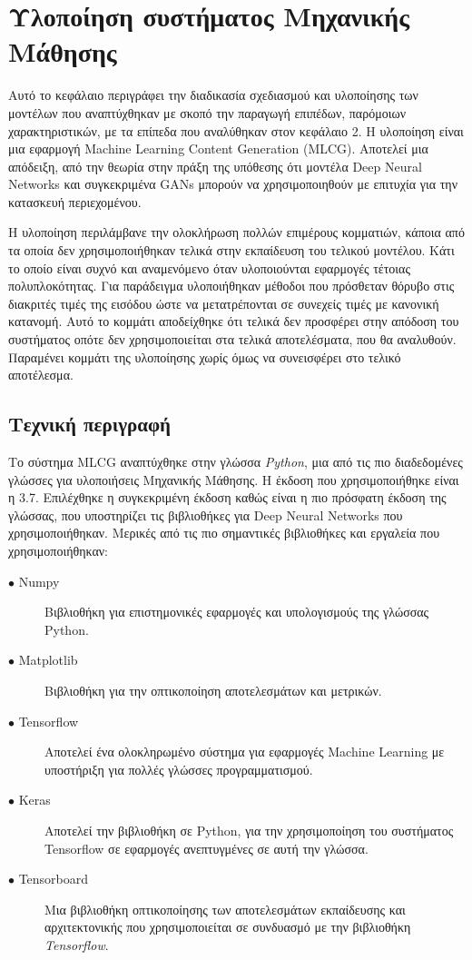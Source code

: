 \chapter{Υλοποίηση συστήματος Μηχανικής Μάθησης}

Αυτό το κεφάλαιο περιγράφει την διαδικασία σχεδιασμού και υλοποίησης των μοντέλων που αναπτύχθηκαν με σκοπό την παραγωγή επιπέδων, παρόμοιων χαρακτηριστικών, με τα επίπεδα που αναλύθηκαν στον κεφάλαιο 2. Η υλοποίηση είναι μια εφαρμογή Machine Learning Content Generation (MLCG). Αποτελεί μια απόδειξη, από την θεωρία στην πράξη της υπόθεσης ότι μοντέλα Deep Neural Networks και συγκεκριμένα GANs \cite{firstgan3} \cite{firstgan} \cite{firstgan2} μπορούν να χρησιμοποιηθούν με επιτυχία για την κατασκευή περιεχομένου.
\par
Η υλοποίηση περιλάμβανε την ολοκλήρωση πολλών επιμέρους κομματιών, κάποια από τα οποία δεν χρησιμοποιήθηκαν τελικά στην εκπαίδευση του τελικού μοντέλου. Κάτι το οποίο είναι συχνό και αναμενόμενο όταν υλοποιούνται εφαρμογές τέτοιας πολυπλοκότητας. Για παράδειγμα υλοποιήθηκαν μέθοδοι που πρόσθεταν θόρυβο στις διακριτές τιμές της εισόδου ώστε να μετατρέπονται σε συνεχείς τιμές με κανονική κατανομή. Αυτό το κομμάτι αποδείχθηκε ότι τελικά δεν προσφέρει στην απόδοση του συστήματος οπότε δεν χρησιμοποιείται στα τελικά αποτελέσματα, που θα αναλυθούν. Παραμένει κομμάτι της υλοποίησης χωρίς όμως να συνεισφέρει στο τελικό αποτέλεσμα.

\section{Τεχνική περιγραφή}
Το σύστημα MLCG αναπτύχθηκε στην γλώσσα \textit{Python}, μια από τις πιο διαδεδομένες γλώσσες για υλοποιήσεις Μηχανικής Μάθησης. Η έκδοση που χρησιμοποιήθηκε είναι η 3.7. Επιλέχθηκε η συγκεκριμένη έκδοση καθώς είναι η πιο πρόσφατη έκδοση της γλώσσας, που υποστηρίζει τις βιβλιοθήκες για Deep Neural Networks που χρησιμοποιήθηκαν. 
Μερικές από τις πιο σημαντικές βιβλιοθήκες και εργαλεία που χρησιμοποιήθηκαν:

\begin{description}
\item[$\bullet$ Numpy] Βιβλιοθήκη για επιστημονικές εφαρμογές και υπολογισμούς της γλώσσας Python.
\item[$\bullet$ Matplotlib] Βιβλιοθήκη για την οπτικοποίηση αποτελεσμάτων και μετρικών.
\item[$\bullet$ Tensorflow] Αποτελεί ένα ολοκληρωμένο σύστημα για εφαρμογές Machine Learning με υποστήριξη για πολλές γλώσσες προγραμματισμού. 
\item[$\bullet$ Keras] Αποτελεί την βιβλιοθήκη σε Python, για την χρησιμοποίηση του συστήματος Tensorflow σε εφαρμογές ανεπτυγμένες σε αυτή την γλώσσα.
\item[$\bullet$ Tensorboard] Μια βιβλιοθήκη οπτικοποίησης των αποτελεσμάτων εκπαίδευσης και αρχιτεκτονικής που χρησιμοποιείται σε συνδυασμό με την βιβλιοθήκη \textit{Tensorflow}. 
\end{description}


